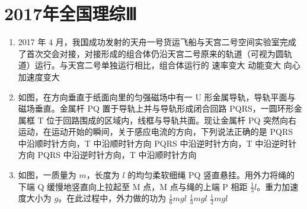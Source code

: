 \documentclass[\gkver]{gaokaozhenti}
\begin{document}
\chapter{2017年全国理综Ⅲ}

\begin{enumerate}
\item
2017 年 4 月，我国成功发射的天舟一号货运飞船与天宫二号空间实验室完成了首次交会对接，对接形成的组合体仍沿天宫二号原来的轨道（可视为圆轨道）运行。与天宫二号单独运行相比，组合体运行的
{速率变大}
{动能变大}
{向心加速度变大}


\item
如图，在方向垂直于纸面向里的匀强磁场中有一 U 形金属导轨，导轨平面与磁场垂直。金属杆 PQ 置于导轨上并与导轨形成闭合回路 PQRS，一圆环形金属框 T 位于回路围成的区域内，线框与导轨共面。现让金属杆 PQ 突然向右运动，在运动开始的瞬间，关于感应电流的方向，下列说法正确的是
{PQRS 中沿顺时针方向，T 中沿顺时针方向}
{PQRS 中沿逆时针方向，T 中沿逆时针方向}
{PQRS 中沿逆时针方向，T 中沿顺时针方向}


\item
如图，一质量为 $m$，长度为 $l$ 的均匀柔软细绳 PQ 竖直悬挂。用外力将绳的下端 Q 缓慢地竖直向上拉起至 M 点，M 点与绳的上端 P 相距 $\frac{1}{3}l$。重力加速度大小为 $g$。在此过程中，外力做的功为
\onepicture[h=3.17cm]{}
{$\frac{1}{6}mgl$}
{$\frac{1}{3}mgl$}
{$\frac{1}{2}mgl$}


\end{enumerate}
\end{document}
